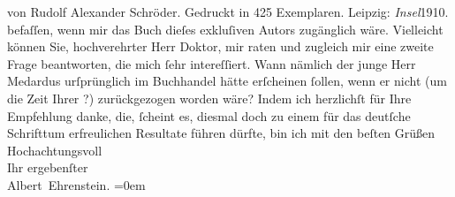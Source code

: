 \begin{ledgroupsized}[t]{13cm}
{{{                     von Rudolf Alexander Schröder. Gedruckt
                     in 425 Exemplaren. Leipzig: \emph{Insel}1910.}}}\label{K_L01912-3h} befaſſen, wenn mir das Buch dieſes exkluſiven Autors zugänglich
               wäre. Vielleicht können Sie, hochverehrter Herr Doktor, mir raten und zugleich mir
               eine zweite Frage beantworten, die mich ſehr intereſſiert. Wann nämlich der junge Herr Medardus urſprünglich im Buchhandel
               hätte erſcheinen ſollen, wenn er nicht (um die Zeit Ihrer \label{K_L01912-4v}\label{K_L01912-4h}?) zurückgezogen worden wäre?\pend
           \pstart
           Indem ich herzlichſt für Ihre Empfehlung danke, die, ſcheint es, diesmal doch zu
               einem für das deutſche Schrifttum erfreulichen Resultate führen dürfte, bin ich mit den beſten Grüßen\pend
           \pstart
           Hochachtungsvoll{\\[\baselineskip]}Ihr ergebenſter{\\[\baselineskip]}\spacefill\mbox{Albert Ehrenstein.}\pend
           \leftskip=0em{}
         
         \endnumbering{}\end{ledgroupsized}  \newcommand{\dateiname}{L01912}\newcommand{\titel}{Albert Ehrenstein an Arthur Schnitzler, 10. 2. 1910}\newcommand{\editorInnen}{Martin Anton Müller und Gerd-Hermann Susen}
      